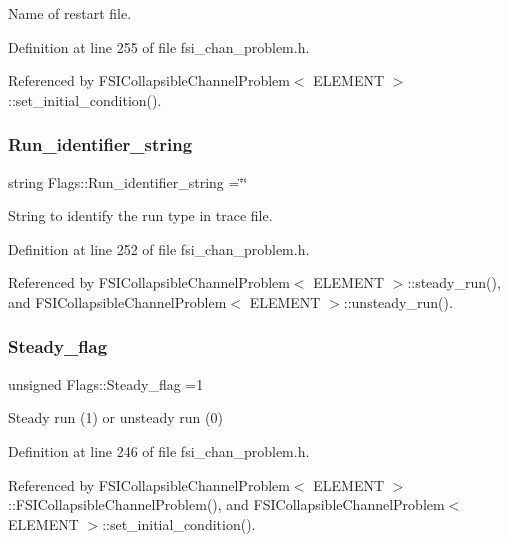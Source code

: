 Name of restart file. 



Definition at line 255 of file fsi\+\_\+chan\+\_\+problem.\+h.



Referenced by F\+S\+I\+Collapsible\+Channel\+Problem$<$ E\+L\+E\+M\+E\+N\+T $>$\+::set\+\_\+initial\+\_\+condition().

\mbox{\label{namespaceFlags_a4401f7e5174d2dc44ec0e7a0d94869af}} 
\subsubsection{\texorpdfstring{Run\+\_\+identifier\+\_\+string}{Run\_identifier\_string}}
{\footnotesize\ttfamily string Flags\+::\+Run\+\_\+identifier\+\_\+string =\char`\"{}\char`\"{}}



String to identify the run type in trace file. 



Definition at line 252 of file fsi\+\_\+chan\+\_\+problem.\+h.



Referenced by F\+S\+I\+Collapsible\+Channel\+Problem$<$ E\+L\+E\+M\+E\+N\+T $>$\+::steady\+\_\+run(), and F\+S\+I\+Collapsible\+Channel\+Problem$<$ E\+L\+E\+M\+E\+N\+T $>$\+::unsteady\+\_\+run().

\mbox{\label{namespaceFlags_a94cadbe3202fa6f29b6aa5e7b491a9ae}} 
\subsubsection{\texorpdfstring{Steady\+\_\+flag}{Steady\_flag}}
{\footnotesize\ttfamily unsigned Flags\+::\+Steady\+\_\+flag =1}



Steady run (1) or unsteady run (0) 



Definition at line 246 of file fsi\+\_\+chan\+\_\+problem.\+h.



Referenced by F\+S\+I\+Collapsible\+Channel\+Problem$<$ E\+L\+E\+M\+E\+N\+T $>$\+::\+F\+S\+I\+Collapsible\+Channel\+Problem(), and F\+S\+I\+Collapsible\+Channel\+Problem$<$ E\+L\+E\+M\+E\+N\+T $>$\+::set\+\_\+initial\+\_\+condition().

